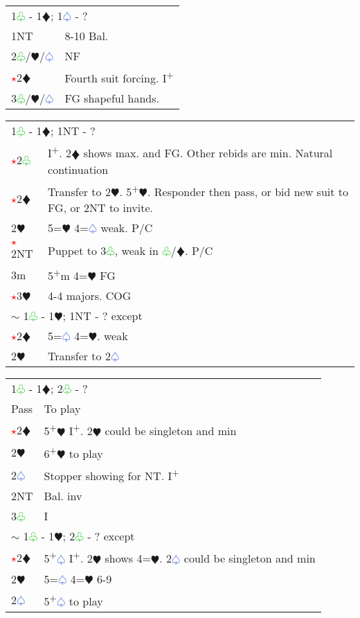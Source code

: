 \documentclass{article}
\renewcommand{\sp}{\textcolor{RoyalBlue}{$\varspade$}}
\newcommand{\he}{\textcolor{RubineRed}{$\varheart$}}
\newcommand{\di}{\textcolor{Peach}{$\vardiamond$}}
\newcommand{\cl}{\textcolor{LimeGreen}{$\varclub$}}
\newcommand{\nt}{\relsize{-1}NT\relsize{1}}
\newcommand{\up}{\textsuperscript{+}}
\newcommand{\al}{\textcolor{red}{$\star$}}
\begin{document}
\medskip

\begin{tabular}{|l|p{6.5cm}}
	\multicolumn{2}{l}{1\cl{} - 1\di{}; 1\sp{} - ?}\\
	1\nt & 8-10 Bal.\\
	2\cl{}/\he{}/\sp{} & NF \\
	\al{}2\di{} & Fourth suit forcing. I\up \\
    3\cl{}/\he{}/\sp{} & FG shapeful hands.
\end{tabular}

\medskip

\begin{tabular}{|l|p{6.5cm}}
	\multicolumn{2}{l}{1\cl{} - 1\di{}; 1\nt{} - ?}\\
	\al{}2\cl{} & I\up{}. 2\di{} shows max. and FG. Other rebids are min. Natural continuation\\
	\al{}2\di{} & Transfer to 2\he{}. 5\up\he{}. Responder then pass, or bid new suit to FG, or 2\nt{} to invite. \\
    2\he{}& 5=\he{} 4=\sp{} weak. P/C \\
    \al{}2\nt & Puppet to 3\cl{}, weak in \cl{}/\di{}. P/C \\
    3m & 5\up m 4=\he{} FG \\
    \al{}3\he{}& 4-4 majors. COG \\
		\multicolumn{2}{l}{$\sim$ 1\cl{} - 1\he{}; 1\nt{} - ? except}\\
		\al{}2\di{} & 5=\sp{} 4=\he{}. weak \\
		2\he{}& Transfer to 2\sp{} \\
\end{tabular}

\medskip

\begin{tabular}{|l|p{6.5cm}}
	\multicolumn{2}{l}{1\cl{} - 1\di{}; 2\cl{} - ?}\\
	Pass & To play \\
	\al{}2\di{} & 5\up{}\he{} I\up{}. 2\he{} could be singleton and min \\
	2\he{} & 6\up\he{} to play\\
	2\sp{} & Stopper showing for \nt{}. I\up{} \\
	2\nt{} & Bal. inv \\
	3\cl{} & I \\
	\multicolumn{2}{l}{$\sim$ 1\cl{} - 1\he{}; 2\cl{} - ? except} \\
	\al{}2\di{} & 5\up\sp{} I\up{}. 2\he{} shows 4=\he{}. 2\sp{} could be singleton and min \\
	2\he{} & 5=\sp{} 4=\he{} 6-9 \\
	2\sp{} & 5\up\sp{} to play
\end{tabular}
\end{document}
